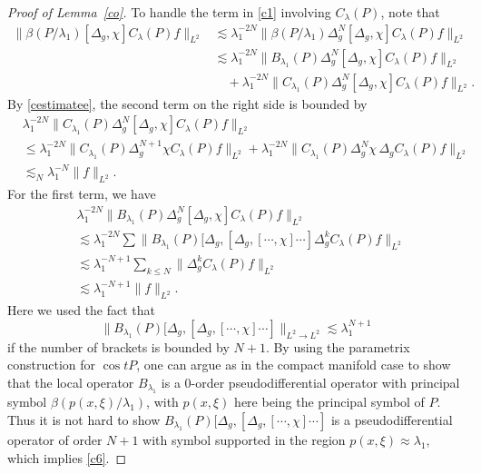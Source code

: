 \documentclass[10pt]{amsart}
\newcommand{\la}{\lambda}
\newcommand{\1}{{\bf 1}}
\begin{document}
\begin{proof}[Proof of Lemma~\ref{co}]
   To handle the term in \eqref{c1} involving $C_{\la}(P)$, note that 
\begin{equation*}
    \begin{split}
         \|\beta(P/\la_1) [\Delta_g, \chi] C_\la(P) f\|_{L^2}
         &\lesssim \la_1^{-2N}\|\beta(P/\la_1)\Delta_g^N [\Delta_g, \chi] C_\la(P) f\|_{L^2}\\
         &\lesssim \la_1^{-2N}\|B_{\la_1}(P)\Delta_g^N [\Delta_g, \chi] C_\la(P) f\|_{L^2}\\
         &\quad+\la_1^{-2N}\|C_{\la_1}(P)\Delta_g^N [\Delta_g, \chi] C_\la(P) f\|_{L^2}.
    \end{split}
\end{equation*}
By \eqref{cestimatee}, the second term on the right side is bounded by
\begin{equation}\label{c4}
\begin{split}
&\la_1^{-2N}\|C_{\la_1}(P)\Delta_g^N [\Delta_g, \chi] C_\la(P) f\|_{L^2} 
\\ &\leq
    \la_1^{-2N}\|C_{\la_1}(P)\Delta_g^{N+1}  \chi C_\la(P) f\|_{L^2} 
    +  \la_1^{-2N}\|C_{\la_1}(P)\Delta_g^N \chi\,\Delta_g C_\la(P) f\|_{L^2}\\
    &\lesssim_N \la_1^{-N}\| f\|_{L^2}.
\end{split}
\end{equation}
For the first term, we have
\begin{equation}\label{c5}
    \begin{split}
    &\la_1^{-2N}\|B_{\la_1}(P)\Delta_g^N [\Delta_g, \chi] C_\la(P) f\|_{L^2} \\
    &\lesssim \la_1^{-2N}\sum\| B_{\la_1}(P)[\Delta_g,[\Delta_g,[\cdots,\chi]\cdots]\Delta_g^{k} C_{\lambda} (P)f\|_{L^2} \\
    &\lesssim \la_1^{-N+1}\sum_{k\le N}\|\Delta_g^k C_{\lambda} (P)f\|_{L^2}\\
    &\lesssim \la_1^{-N+1}\|f\|_{L^2}.
    \end{split}
\end{equation}
Here we used the fact that 
\begin{equation}\label{c6}
    \| B_{\la_1}(P)[\Delta_g,[\Delta_g,[\cdots,\chi]\cdots]\|_{L^2\to L^2}\lesssim \la_1^{N+1}
\end{equation}
if the number of brackets is bounded by $N+1$. By using the parametrix construction for $\cos tP$, 
 one can argue as in the compact manifold case to show that the local operator $B_{\la_1}$ is a 0-order pseudodifferential operator with principal symbol $\beta(p(x,\xi)/\la_1)$,
with $p(x,\xi)$ here being the principal symbol of $P$. Thus it is not hard to show  $B_{\la_1}(P)[\Delta_g,[\Delta_g,[\cdots,\chi]\cdots]$ is a pseudodifferential operator of order $N+1$ with symbol supported in the region $p(x,\xi)\approx \la_1$, which implies \eqref{c6}.


\end{proof}
\end{document}
